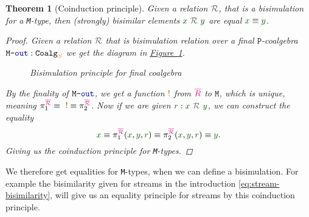 \documentclass[twoside,11pt,openright]{report}
\theoremstyle{plain} %
\newtheorem{thm}{Theorem}[section]
\theoremstyle{definition}
\theoremstyle{remark}
\newcommand*{\figref}[1]{\hyperref[fig:#1]{Figure~\ref*{fig:#1}}}
\newcommand*{\term}[1]{\textcolor{green!30!black}{#1}} %
\newcommand*{\type}[1]{\textcolor{magenta!90!black}{#1}}
\newcommand*{\container}[1]{\textcolor{orange}{#1}}
\newcommand*{\coalg}[2]{#1\texttt{-}#2}
\newcommand*{\relation}[1]{\textcolor{gray!75!black}{\ensuremath{\mathtt{#1}}}}
\newcommand*{\constant}[1]{\textcolor{orange!60!black}{\ensuremath{\mathtt{#1}}}}
\newcommand*{\function}[1]{\textcolor{blue!60!black}{\ensuremath{\mathtt{#1}}}}
\newcommand*{\typeformer}[1]{\ensuremath{\mathtt{#1}}}
\newcommand*{\functor}[1]{\ensuremath{\mathbf{\mathtt{#1}}}}
\begin{document}
\begin{thm}[Coinduction principle]
  \label{thm:M-coinduction-principle}
  Given a relation \(\relation{\mathcal{R}}\), that is a bisimulation for a \texttt{M}-type, then (strongly) bisimilar elements \(\term{x}~\relation{\mathcal{R}}~\term{y}\) are equal \(\term{x} \equiv \term{y}\).  
  \begin{proof}
    Given a relation \(\relation{\mathcal{R}}\) that is bisimulation relation over a final \(\functor{P}\)-coalgebra \(\coalg{\typeformer{M}}{\function{out}}:\mathtt{Coalg}_{\container{S}}\) we get the diagram in \figref{final-coalgebra-coinduction}.
    \begin{figure}[h]
      \centering
      \caption{Bisimulation principle for final coalgebra}
      \label{fig:final-coalgebra-coinduction}
    \end{figure}
    By the finality of \(\coalg{\typeformer{M}}{\function{out}}\), we get a function \(\constant{!}\) from \(\type{\overline{R}}\) to \(\typeformer{M}\), which is unique, meaning \(\pi_1^{\type{\overline{\mathcal{R}}}} \equiv ~\constant{!} \equiv \pi_2^{\type{\overline{\mathcal{R}}}}\). Now if we are given \(\term{r} : \term{x}~\relation{\mathcal{R}}~\term{y}\), we can construct the equality
    \begin{equation}
      \term{x} \equiv \pi_1^{\type{\overline{\mathcal{R}}}} (\term{x}, \term{y}, \term{r}) \equiv \pi_2^{\type{\overline{\mathcal{R}}}} (\term{x}, \term{y}, \term{r}) \equiv \term{y}.
    \end{equation}
    Giving us the coinduction principle for \texttt{M}-types.
  \end{proof}
\end{thm}
\noindent We therefore get equalities for \texttt{M}-types, when we can define a bisimulation. For example the bisimilarity given for streams in the introduction \eqref{eq:stream-bisimilarity}, will give us an equality principle for streams by this coinduction principle.

\end{document}
